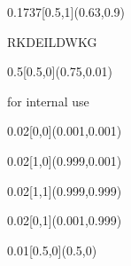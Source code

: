 \documentclass[a4paper]{article}
\begin{document}
\begin{textblock}{0.1737}[0.5,1](0.63,0.9)
  \begin{center}
    RKDEILDWKG
  \end{center}
\end{textblock}

\begin{textblock}{0.5}[0.5,0](0.75,0.01)
  \begin{center} for internal use \end{center}
\end{textblock}


\begin{textblock}{0.02}[0,0](0.001,0.001)
\end{textblock}

\begin{textblock}{0.02}[1,0](0.999,0.001)
\end{textblock}

\begin{textblock}{0.02}[1,1](0.999,0.999)
\end{textblock}

\begin{textblock}{0.02}[0,1](0.001,0.999)
\end{textblock}

\begin{textblock}{0.01}[0.5,0](0.5,0) 
\end{textblock}
\end{document}
